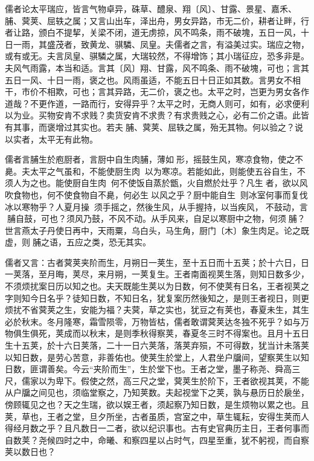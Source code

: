 \documentclass[]{article}
\begin{document}
儒者论太平瑞应，皆言气物卓异，硃草、醴泉、翔〔风〕、甘露、景星、嘉禾、脯、蓂荚、屈轶之属；又言山出车，泽出舟，男女异路，市无二价，耕者让畔，行者让路，颁白不提挈，关梁不闭，道无虏掠，风不鸣条，雨不破塊，五日一风，十日一雨，其盛茂者，致黄龙、骐驎、凤皇。夫儒者之言，有溢美过实。瑞应之物，或有或无。夫言凤皇、骐驎之属，大瑞较然，不得增饰；其小瑞征应，恐多非是。夫风气雨露，本当和适。言其〔风〕翔、甘露，风不鸣条、雨不破塊，可也；言其五日一风、十日一雨，褒之也。风雨虽适，不能五日十日正如其数。言男女不相干，市价不相欺，可也；言其异路，无二价，褒之也。太平之时，岂更为男女各作道哉？不更作道，一路而行，安得异乎？太平之时，无商人则可，如有，必求便利以为业。买物安肯不求贱？卖货安肯不求贵？有求贵贱之心，必有二价之语。此皆有其事，而褒增过其实也。若夫脯、蓂荚、屈轶之属，殆无其物。何以验之？说以实者，太平无有此物。

儒者言脯生於庖厨者，言厨中自生肉脯，薄如形，摇鼓生风，寒凉食物，使之不臰。夫太平之气虽和，不能使厨生肉，以为寒凉。若能如此，则能使五谷自生，不须人为之也。能使厨自生肉，何不使饭自蒸於甑，火自燃於灶乎？凡生者，欲以风吹食物也，何不使食物自不臰，何必生以风之乎？厨中能自生，则冰室何事而复伐冰以寒物乎？人夏月操，须手摇之，然後生风，从手握持，以当疾风，不鼓动，言脯自鼓，可也？须风乃鼓，不风不动。从手风来，自足以寒厨中之物，何须脯？世言燕太子丹使日再中，天雨粟，乌白头，马生角，厨门〔木〕象生肉足。论之既虚，则脯之语，五应之类，恐无其实。

儒者又言：古者蓂荚夹阶而生，月朔日一荚生，至十五日而十五荚；於十六日，日一荚落，至月晦，荚尽，来月朔，一荚复生。王者南面视荚生落，则知日数多少，不须烦扰案日历以知之也。夫天既能生荚以为日数，何不使荚有日名，王者视荚之字则知今日名乎？徒知日数，不知日名，犹复案历然後知之，是则王者视日，则更烦扰不省蓂荚之生，安能为福？夫蓂，草之实也，犹豆之有荚也，春夏未生，其生必於秋末。冬月隆寒，霜雪陨零，万物皆枯，儒者敢谓蓂荚达冬独不死乎？如与万物俱生俱死，荚成而以秋末，是则季秋得察荚，春夏冬三时不得案也。且月十五日生十五荚，於十六日荚落，二十一日六荚落，落荚弃殒，不可得数，犹当计未落荚以知日数，是劳心苦意，非善佑也。使荚生於堂上，人君坐户牖间，望察荚生以知日数，匪谓善矣。今云``夹阶而生''，生於堂下也。王者之堂，墨子称尧、舜高三尺，儒家以为卑下。假使之然，高三尺之堂，蓂荚生於阶下，王者欲视其荚，不能从户牖之间见也，须临堂察之，乃知荚数。夫起视堂下之荚，孰与悬历日於扆坐，傍顾辄见之也？天之生瑞，欲以娱王者，须起察乃知日数，是生烦物以累之也。且荚，草也，王者之堂，旦夕所坐，古者虽质，宫室之中，草生辄耘，安得生荚而人得经月数之乎？且凡数日一二者，欲以纪识事也。古有史官典历主日，王者何事而自数荚？尧候四时之中，命曦、和察四星以占时气，四星至重，犹不躬视，而自察荚以数日也？
\end{document}
